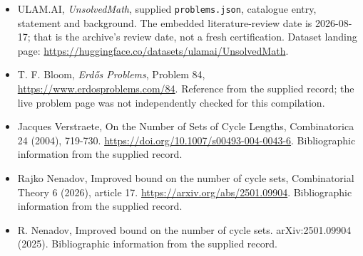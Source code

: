 \documentclass[11pt,a4paper]{article}
\begin{document}
{\small

\begin{itemize}

\item[\hypertarget{source:statement:1}{S1}] ULAM.AI, \emph{UnsolvedMath}, supplied \texttt{problems.json}, catalogue entry, statement and background. The embedded literature-review date is 2026-08-17; that is the archive’s review date, not a fresh certification. Dataset landing page: \url{https://huggingface.co/datasets/ulamai/UnsolvedMath}.

\item[\hypertarget{source:statement:2}{S2}] T. F. Bloom, \emph{Erdős Problems}, Problem 84, \url{https://www.erdosproblems.com/84}. Reference from the supplied record; the live problem page was not independently checked for this compilation.

\item[\hypertarget{source:statement:3}{S3}] Jacques Verstraete, On the Number of Sets of Cycle Lengths, Combinatorica 24 (2004), 719-730. \url{https://doi.org/10.1007/s00493-004-0043-6}. Bibliographic information from the supplied record.

\item[\hypertarget{source:statement:4}{S4}] Rajko Nenadov, Improved bound on the number of cycle sets, Combinatorial Theory 6 (2026), article 17. \url{https://arxiv.org/abs/2501.09904}. Bibliographic information from the supplied record.

\item[\hypertarget{source:statement:5}{S5}] R. Nenadov, Improved bound on the number of cycle sets. arXiv:2501.09904 (2025). Bibliographic information from the supplied record.

\end{itemize}

}

\label{end:statement}
\end{document}
